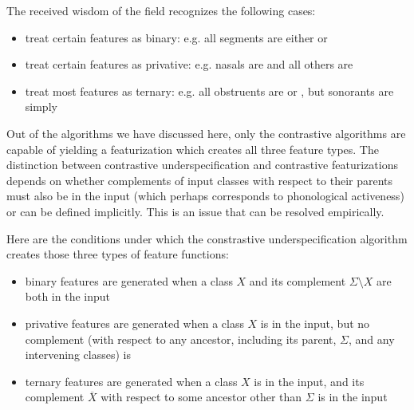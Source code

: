 \documentclass[11pt, oneside]{article}   	%
\begin{document}
The received wisdom of the field recognizes the following cases: \begin{itemize}
    \item treat certain features as binary: e.g. all segments are either  or 
    \item treat certain features as privative: e.g. nasals are  and all others are 
    \item treat most features as ternary: e.g. all obstruents are  or , but sonorants are simply 
    \end{itemize}
Out of the algorithms we have discussed here, only the contrastive algorithms are capable of yielding a featurization which creates all three feature types. The distinction between contrastive underspecification and contrastive featurizations depends on whether complements of input classes with respect to their parents must also be in the input (which perhaps corresponds to phonological activeness) or can be defined implicitly. This is an issue that can be resolved empirically.

Here are the conditions under which the constrastive underspecification algorithm creates those three types of feature functions:
\begin{itemize}
    \item binary features are generated when a class $X$ and its complement $\Sigma \setminus X$ are both in the input
    \item privative features are generated when a class $X$ is in the input, but no complement (with respect to any ancestor, including its parent, $\Sigma$, and any intervening classes) is
    \item ternary features are generated when a class $X$ is in the input, and its complement $\overline{X}$ with respect to some ancestor other than $\Sigma$ is in the input
    \end{itemize}
\end{document}
